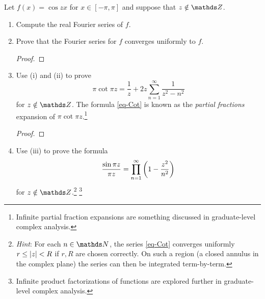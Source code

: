\documentclass{../homework}
\date{Thursday 5/2}
\author{}
\begin{document}
\begin{Exercise}
  Let \(f(x) = \cos zx\) for \(x \in [-\pi,\pi]\) and suppose that
  \(z \notin \Z\).
  \begin{enumerate}
  \item Compute the real Fourier series of \(f\).

    \begin{solution}

    \end{solution}

  \item Prove that the Fourier series for \(f\) converges uniformly to
    \(f\).

    \begin{solution}
      \begin{proof}

      \end{proof}
    \end{solution}

  \item Use (i) and (ii) to prove
    \begin{equation}\label{eq-Cot}
      \pi \cot \pi z
      = \frac{1}{z} + 2z \sum_{n=1}^{\infty} \frac{1}{z^2 - n^2}
    \end{equation}
    for \(z \notin \Z\).  The formula \eqref{eq-Cot} is known as the
    \emph{partial fractions} expansion of
    \(\pi \cot \pi z\).\footnote{Infinite partial fraction expansions
      are something discussed in graduate-level complex analysis.}

    \begin{solution}
      \begin{proof}

      \end{proof}
    \end{solution}

  \item Use (iii) to prove the formula
    \begin{equation}\label{eq-Sine}
      \frac{\sin \pi z}{\pi z}
      = \prod_{n=1}^{\infty} \left( {1 - \frac{z^2}{n^2}} \right)
    \end{equation}
    for \(z \notin \Z\).\footnote{\emph{Hint}: For each \(n \in \N\),
      the series \eqref{eq-Cot} converges uniformly
      \(r \leq \lvert {z} \rvert < R\) if \(r,R\) are chosen correctly.  On such
      a region (a closed annulus in the complex plane) the series can
      then be integrated term-by-term.} \footnote{Infinite product
      factorizations of functions are explored further in
      graduate-level complex analysis.}


\end{enumerate}
\end{Exercise}
\end{document}
